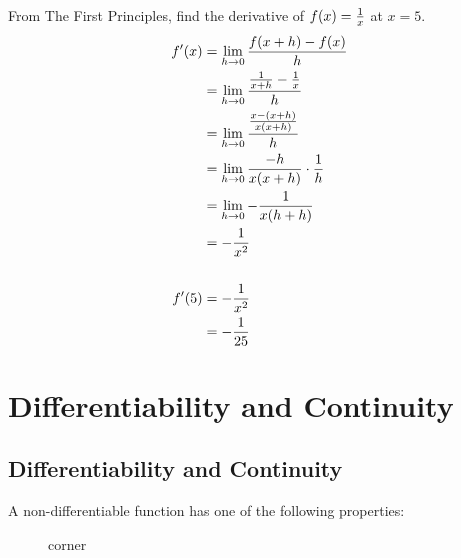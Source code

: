 \begin{exercise}\nonumber
    From The First Principles, find the derivative of $ f(x) = {1 \over x} $ at $ x = 5 $. \\

    \begin{align}
        f'(x) & = \lim\limits_{h \rightarrow 0}{f(x+h) - f(x) \over h}               \\
              & = \lim\limits_{h \rightarrow 0}{{1 \over x+h} - {1 \over x} \over h} \\
              & = \lim\limits_{h \rightarrow 0}{{x-(x+h) \over x(x+h)} \over h}      \\
              & = \lim\limits_{h \rightarrow 0}{{-h \over x(x+h)} \cdot {1 \over h}} \\
              & = \lim\limits_{h \rightarrow 0}{-{1 \over x(h+h)}}                   \\
              & = -{1 \over x^2}                                                     \\
        \\
        f'(5) & = -{1 \over x^2}                                                     \\
              & = -{1 \over 25}
    \end{align}
\end{exercise}

\chapter{Differentiability and Continuity}

\section{Differentiability and Continuity}

A non-differentiable function has one of the following properties: \\

\begin{figure}[H]
    \centering
    \caption{corner}
\end{figure}


